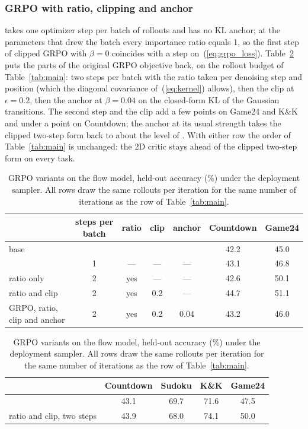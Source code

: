 \subsubsection{GRPO with ratio, clipping and anchor}
\label{app:grpo_variants}
\methodGRPO{} takes one optimizer step per batch of rollouts and has no KL anchor; at the parameters that drew the batch every importance ratio equals 1, so the first step of clipped GRPO with $\beta=0$ coincides with a step on~(\ref{eq:grpo_loss}). Table~\ref{tab:grpo_variants} puts the parts of the original GRPO objective back, on the rollout budget of Table~\ref{tab:main}: two steps per batch with the ratio taken per denoising step and position (which the diagonal covariance of~(\ref{eq:kernel}) allows), then the clip at $\epsilon=0.2$, then the anchor at $\beta=0.04$ on the closed-form KL of the Gaussian transitions. The second step and the clip add a few points on Game24 and K\&K and under a point on Countdown; the anchor at its usual strength takes the clipped two-step form back to about the level of \methodGRPO{}. With either row the order of Table~\ref{tab:main} is unchanged: the 2D critic stays ahead of the clipped two-step form on every task.

\begin{table}[H]\centering\small
\caption{GRPO variants on the flow model, held-out accuracy (\%) under the deployment sampler. All rows draw the same rollouts per iteration for the same number of iterations as the \methodGRPO{} row of Table~\ref{tab:main}.}\label{tab:grpo_variants}
\begin{tabular*}{\linewidth}{@{\extracolsep{\fill}}lcccccc@{}}\toprule
 & steps per batch & ratio & clip & anchor & Countdown & Game24 \\\midrule
base & & & & & 42.2 & 45.0 \\
\methodGRPO{} & 1 & --- & --- & --- & 43.1 & 46.8 \\
ratio only & 2 & yes & --- & --- & 42.6 & 50.1 \\
ratio and clip & 2 & yes & 0.2 & --- & 44.7 & 51.1 \\
GRPO, ratio, clip and anchor & 2 & yes & 0.2 & 0.04 & 43.2 & 46.0 \\\bottomrule
\end{tabular*}

\vspace{8pt}
{\setlength{\tabcolsep}{3pt}\begin{tabular*}{\linewidth}{@{\extracolsep{\fill}}lcccc@{}}\toprule
 & Countdown & Sudoku & K\&K & Game24 \\\midrule
\methodGRPO{} & 43.1 & 69.7 & 71.6 & 47.5 \\
ratio and clip, two steps & 43.9 & 68.0 & 74.1 & 50.0 \\\bottomrule
\end{tabular*}}\end{table}


